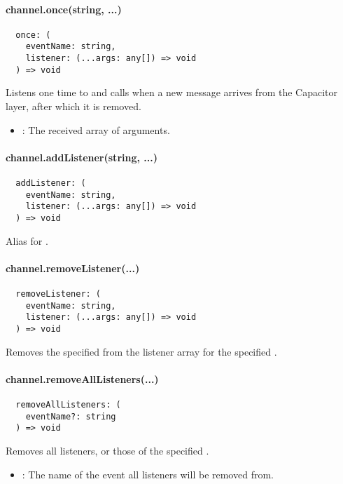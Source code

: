 
\paragraph{channel.once(string, ...)}

\begin{verbatim}
  once: (
    eventName: string,
    listener: (...args: any[]) => void
  ) => void
\end{verbatim}

Listens one time to  and calls  when a new message arrives from the Capacitor layer, after which it is removed.

\begin{itemize}
  \setlength\itemsep{-0.8em}
  \item {}: The received array of arguments.
\end{itemize}


\paragraph{channel.addListener(string, ...)}

\begin{verbatim}
  addListener: (
    eventName: string,
    listener: (...args: any[]) => void
  ) => void
\end{verbatim}

Alias for .


\paragraph{channel.removeListener(...)}

\begin{verbatim}
  removeListener: (
    eventName: string,
    listener: (...args: any[]) => void
  ) => void
\end{verbatim}

Removes the specified  from the listener array for the specified .


\paragraph{channel.removeAllListeners(...)}

\begin{verbatim}
  removeAllListeners: (
    eventName?: string
  ) => void
\end{verbatim}

Removes all listeners, or those of the specified .

\begin{itemize}
  \setlength\itemsep{-0.8em}
  \item {}: The name of the event all listeners will be removed from.
\end{itemize}


\printfn
